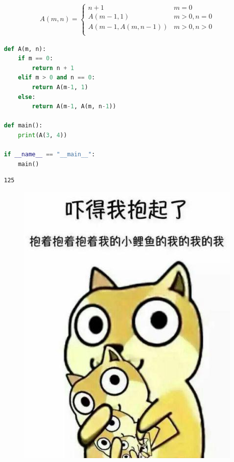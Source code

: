 \vspace{0.5cm}


\begin{align}\nonumber
	A(m, n) =
	\begin{cases}
		n + 1             & m = 0        \\
		A(m-1, 1)         & m > 0, n = 0 \\
		A(m-1, A(m, n-1)) & m > 0, n > 0 \\
	\end{cases}
\end{align}

\begin{lstlisting}[language=Python]
def A(m, n):
	if m == 0:
		return n + 1
	elif m > 0 and n == 0:
		return A(m-1, 1)
	else:
		return A(m-1, A(m, n-1))

def main():
	print(A(3, 4))

if __name__ == "__main__":
	main()
\end{lstlisting}

\begin{tcolorbox}
	\begin{verbatim}
125
\end{verbatim}
\end{tcolorbox}

\begin{figure}[H]
	\centering
	\includegraphics[]{img/C5/5-5/6.png}
\end{figure}

